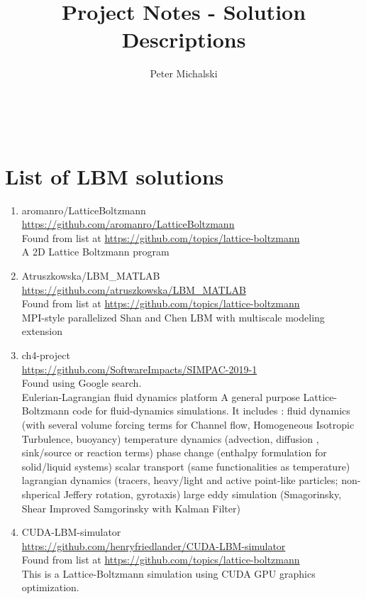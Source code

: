 \documentclass{article}
\title{Project Notes - Solution Descriptions}
\author{Peter Michalski}
\date{}
\begin{document}
\maketitle

~\newpage


\section{List of LBM solutions}
\begin{enumerate}
	\item aromanro/LatticeBoltzmann\\
	\href{https://github.com/aromanro/LatticeBoltzmann}{https://github.com/aromanro/LatticeBoltzmann}\\
	Found from list at \href{https://github.com/topics/lattice-boltzmann}{https://github.com/topics/lattice-boltzmann}\\
	A 2D Lattice Boltzmann program
	
	\item Atruszkowska/LBM\_MATLAB\\
	\href{https://github.com/atruszkowska/LBM_MATLAB}{https://github.com/atruszkowska/LBM\_MATLAB}\\
		Found from list at \href{https://github.com/topics/lattice-boltzmann}{https://github.com/topics/lattice-boltzmann}\\
	MPI-style parallelized Shan and Chen LBM with multiscale modeling extension
	
	\item ch4-project\\
	\href{https://github.com/SoftwareImpacts/SIMPAC-2019-1}{https://github.com/SoftwareImpacts/SIMPAC-2019-1}\\  
	Found using Google search.\\
	Eulerian-Lagrangian fluid dynamics platform
	A general purpose Lattice-Boltzmann code for fluid-dynamics simulations. It includes :
	fluid dynamics (with several volume forcing terms for Channel flow, Homogeneous Isotropic Turbulence, buoyancy)
	temperature dynamics (advection, diffusion , sink/source or reaction terms)
	phase change (enthalpy formulation for solid/liquid systems)
	scalar transport (same functionalities as temperature)
	lagrangian dynamics (tracers, heavy/light and active point-like particles; non-shperical Jeffery rotation, gyrotaxis)
	large eddy simulation (Smagorinsky, Shear Improved Samgorinsky with Kalman Filter)
	
	\item CUDA-LBM-simulator\\
	\href{https://github.com/henryfriedlander/CUDA-LBM-simulator}{https://github.com/henryfriedlander/CUDA-LBM-simulator}\\
		Found from list at \href{https://github.com/topics/lattice-boltzmann}{https://github.com/topics/lattice-boltzmann}\\
	This is a Lattice-Boltzmann simulation using CUDA GPU graphics optimization.
	

\end{enumerate}
\end{document}
